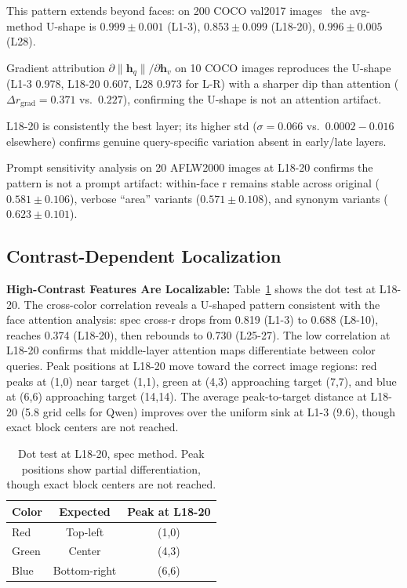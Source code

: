 \documentclass[10pt,twocolumn,letterpaper]{article}
\begin{document}
This pattern extends beyond faces: on 200 COCO val2017 images~\cite{Lin2014coco} the avg-method U-shape is $0.999\pm0.001$ (L1-3), $0.853\pm0.099$ (L18-20), $0.996\pm0.005$ (L28).

Gradient attribution $\partial\|\mathbf{h}_q\|/\partial\mathbf{h}_v$ on 10 COCO images reproduces the U-shape (L1-3 0.978, L18-20 0.607, L28 0.973 for L-R) with a sharper dip than attention ($\Delta r_{\text{grad}} = 0.371$ vs.\ $0.227$), confirming the U-shape is not an attention artifact.

L18-20 is consistently the best layer; its higher std ($\sigma=0.066$ vs.\ $0.0002{-}0.016$ elsewhere) confirms genuine query-specific variation absent in early/late layers.

Prompt sensitivity analysis on 20 AFLW2000 images at L18-20 confirms the pattern is not a prompt artifact: within-face r remains stable across original ($0.581\pm0.106$), verbose ``area'' variants ($0.571\pm0.108$), and synonym variants ($0.623\pm0.101$).

\subsection{Contrast-Dependent Localization}
\label{sec:contrast}

\textbf{High-Contrast Features Are Localizable:} Table~\ref{tab:dot} shows the dot test at L18-20. The cross-color correlation reveals a U-shaped pattern consistent with the face attention analysis: spec cross-r drops from 0.819 (L1-3) to 0.688 (L8-10), reaches 0.374 (L18-20), then rebounds to 0.730 (L25-27). The low correlation at L18-20 confirms that middle-layer attention maps differentiate between color queries. Peak positions at L18-20 move toward the correct image regions: red peaks at (1,0) near target (1,1), green at (4,3) approaching target (7,7), and blue at (6,6) approaching target (14,14). The average peak-to-target distance at L18-20 (5.8 grid cells for Qwen) improves over the uniform sink at L1-3 (9.6), though exact block centers are not reached.

\begin{table}[t]
\centering
\small
\caption{Dot test at L18-20, spec method. Peak positions show partial differentiation, though exact block centers are not reached.}
\label{tab:dot}
\begin{tabular}{lcc}
\toprule
Color & Expected & Peak at L18-20 \\
\midrule
Red & Top-left & (1,0) \\
Green & Center & (4,3) \\
Blue & Bottom-right & (6,6) \\
\bottomrule
\end{tabular}
\end{table}
\end{document}
